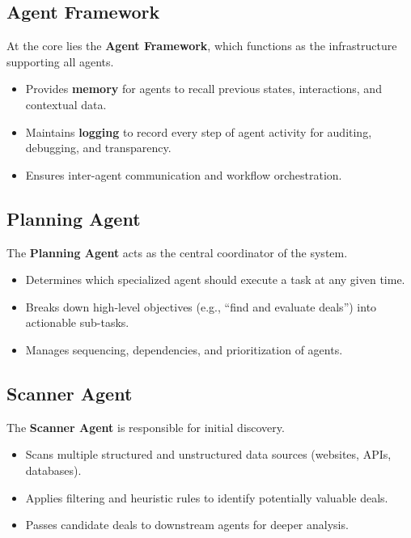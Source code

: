 \documentclass[a4paper, 12pt]{article}
\begin{document}
\subsection*{Agent Framework}

At the core lies the \textbf{Agent Framework}, which functions as the infrastructure supporting all agents.
\begin{itemize}
    \item Provides \textbf{memory} for agents to recall previous states, interactions, and contextual data.  
    \item Maintains \textbf{logging} to record every step of agent activity for auditing, debugging, and transparency.  
    \item Ensures inter-agent communication and workflow orchestration.  
\end{itemize}

\subsection*{Planning Agent}

The \textbf{Planning Agent} acts as the central coordinator of the system.
\begin{itemize}
    \item Determines which specialized agent should execute a task at any given time.  
    \item Breaks down high-level objectives (e.g., ``find and evaluate deals'') into actionable sub-tasks.  
    \item Manages sequencing, dependencies, and prioritization of agents.  
\end{itemize}

\subsection*{Scanner Agent}

The \textbf{Scanner Agent} is responsible for initial discovery.
\begin{itemize}
    \item Scans multiple structured and unstructured data sources (websites, APIs, databases).  
    \item Applies filtering and heuristic rules to identify potentially valuable deals.  
    \item Passes candidate deals to downstream agents for deeper analysis.  
\end{itemize}
\end{document}

